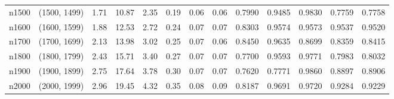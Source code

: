 \begin{tabular}{llrrrrrrrrrrr}
   n1500 & (1500, 1499) &  1.71 & 10.87 & 2.35 & 0.19 &  0.06 &   0.06 &   0.7990 &   0.9485 &    0.9830 &     0.7759 &      0.7758 \\
   n1600 & (1600, 1599) &  1.88 & 12.53 & 2.72 & 0.24 &  0.07 &   0.07 &   0.8303 &   0.9574 &    0.9573 &     0.9537 &      0.9520 \\
   n1700 & (1700, 1699) &  2.13 & 13.98 & 3.02 & 0.25 &  0.07 &   0.06 &   0.8450 &   0.9635 &    0.8699 &     0.8359 &      0.8415 \\
   n1800 & (1800, 1799) &  2.43 & 15.71 & 3.40 & 0.27 &  0.07 &   0.07 &   0.7700 &   0.9593 &    0.9771 &     0.7983 &      0.8032 \\
   n1900 & (1900, 1899) &  2.75 & 17.64 & 3.78 & 0.30 &  0.07 &   0.07 &   0.7620 &   0.7771 &    0.9860 &     0.8897 &      0.8906 \\
   n2000 & (2000, 1999) &  2.96 & 19.45 & 4.32 & 0.35 &  0.08 &   0.09 &   0.8187 &   0.9691 &    0.9720 &     0.9284 &      0.9229 \\
\bottomrule
\end{tabular}
